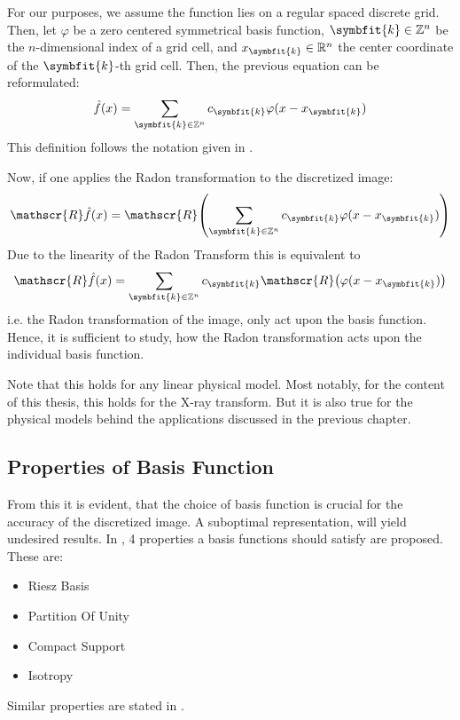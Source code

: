 For our purposes, we assume the function lies on a regular spaced discrete grid. Then, let
\(\varphi\) be a zero centered symmetrical basis function, \(\symbfit{k} \in \mathbb{Z}^n\) be the
\(n\)-dimensional index of a grid cell, and \(x_{\symbfit{k}} \in \mathbb{R}^n\) the center coordinate
of the \(\symbfit{k}\)-th grid cell. Then, the previous equation can be reformulated:
\[ \hat{f}(x) = \sum_{\symbfit{k} \in \mathbb{Z}^n} c_{\symbfit{k}} \varphi(x - x_{\symbfit{k}}) \]
This definition follows the notation given in \cite{momey_new_2011}.


Now, if one applies the Radon transformation to the discretized image: 
\[ \mathscr{R}\hat{f}(x) = \mathscr{R}\left( \sum_{\symbfit{k} \in \mathbb{Z}^n} c_{\symbfit{k}} \varphi(x -
x_{\symbfit{k}}) \right) \]
Due to the linearity of the Radon Transform this is equivalent to
\[ \mathscr{R}\hat{f}(x) =  \sum_{\symbfit{k} \in \mathbb{Z}^n} c_{\symbfit{k}}\mathscr{R}\left( \varphi(x -
x_{\symbfit{k}}) \right) \]
i.e. the Radon transformation of the image, only act upon the basis function. Hence, it is
sufficient to study, how the Radon transformation acts upon the individual basis function.

Note that this holds for any linear physical model. Most notably, for the content of this
thesis, this holds for the X-ray transform. But it is also true for the physical models behind
the applications discussed in the previous chapter.

\subsection{Properties of Basis Function}


From this it is evident, that the choice of basis function is crucial for the accuracy of the
discretized image. A suboptimal representation, will yield undesired results. In
\cite{nilchian_optimized_2015}, 4 properties a basis functions should satisfy are proposed. These are:
\begin{itemize}
    \item Riesz Basis
    \item Partition Of Unity
    \item Compact Support
    \item Isotropy
\end{itemize}
Similar properties are stated in \cite{hanson_local_1985}.

